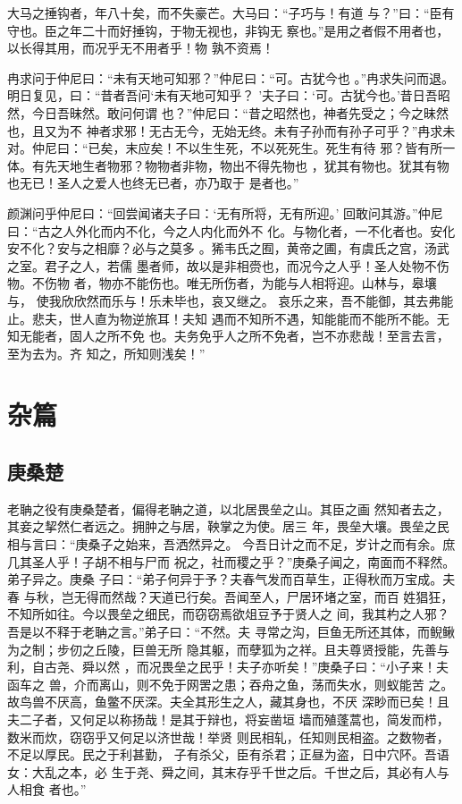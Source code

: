 \documentclass[a4paper,12pt,UTF8,twoside]{ctexbook}
\begin{document}
大马之捶钩者，年八十矣，而不失豪芒。大马曰：“子巧与！有道 与？”曰：“臣有守也。臣之年二十而好捶钩，于物无视也，非钩无 察也。”是用之者假不用者也，以长得其用，而况乎无不用者乎！物 孰不资焉！

冉求问于仲尼曰：“未有天地可知邪？”仲尼曰：“可。古犹今也 。”冉求失问而退。明日复见，曰：“昔者吾问‘未有天地可知乎？ ’夫子曰：‘可。古犹今也。’昔日吾昭然，今日吾昧然。敢问何谓 也？”仲尼曰：“昔之昭然也，神者先受之；今之昧然也，且又为不 神者求邪！无古无今，无始无终。未有子孙而有孙子可乎？”冉求未 对。仲尼曰：“已矣，末应矣！不以生生死，不以死死生。死生有待 邪？皆有所一体。有先天地生者物邪？物物者非物，物出不得先物也 ，犹其有物也。犹其有物也无已！圣人之爱人也终无已者，亦乃取于 是者也。”

颜渊问乎仲尼曰：“回尝闻诸夫子曰：‘无有所将，无有所迎。’ 回敢问其游。”仲尼曰：“古之人外化而内不化，今之人内化而外不 化。与物化者，一不化者也。安化安不化？安与之相靡？必与之莫多 。狶韦氏之囿，黄帝之圃，有虞氏之宫，汤武之室。君子之人，若儒 墨者师，故以是非相赍也，而况今之人乎！圣人处物不伤物。不伤物 者，物亦不能伤也。唯无所伤者，为能与人相将迎。山林与，皋壤与， 使我欣欣然而乐与！乐未毕也，哀又继之。 哀乐之来，吾不能御，其去弗能止。悲夫，世人直为物逆旅耳！夫知 遇而不知所不遇，知能能而不能所不能。无知无能者，固人之所不免 也。夫务免乎人之所不免者，岂不亦悲哉！至言去言，至为去为。齐 知之，所知则浅矣！”


\chapter{杂篇}

\section{庚桑楚}

老聃之役有庚桑楚者，偏得老聃之道，以北居畏垒之山。其臣之画 然知者去之，其妾之挈然仁者远之。拥肿之与居，鞅掌之为使。居三 年，畏垒大壤。畏垒之民相与言曰：“庚桑子之始来，吾洒然异之。 今吾日计之而不足，岁计之而有余。庶几其圣人乎！子胡不相与尸而 祝之，社而稷之乎？”庚桑子闻之，南面而不释然。弟子异之。庚桑 子曰：“弟子何异于予？夫春气发而百草生，正得秋而万宝成。夫春 与秋，岂无得而然哉？天道已行矣。吾闻至人，尸居环堵之室，而百 姓猖狂，不知所如往。今以畏垒之细民，而窃窃焉欲俎豆予于贤人之 间，我其杓之人邪？吾是以不释于老聃之言。”弟子曰：“不然。夫 寻常之沟，巨鱼无所还其体，而鲵鳅为之制；步仞之丘陵，巨兽无所 隐其躯，而孽狐为之祥。且夫尊贤授能，先善与利，自古尧、舜以然 ，而况畏垒之民乎！夫子亦听矣！”庚桑子曰：“小子来！夫函车之 兽，介而离山，则不免于网罟之患；吞舟之鱼，荡而失水，则蚁能苦 之。故鸟兽不厌高，鱼鳖不厌深。夫全其形生之人，藏其身也，不厌 深眇而已矣！且夫二子者，又何足以称扬哉！是其于辩也，将妄凿垣 墙而殖蓬蒿也，简发而栉，数米而炊，窃窃乎又何足以济世哉！举贤 则民相轧，任知则民相盗。之数物者，不足以厚民。民之于利甚勤， 子有杀父，臣有杀君；正昼为盗，日中穴阫。吾语女：大乱之本，必 生于尧、舜之间，其末存乎千世之后。千世之后，其必有人与人相食 者也。”
\end{document}
